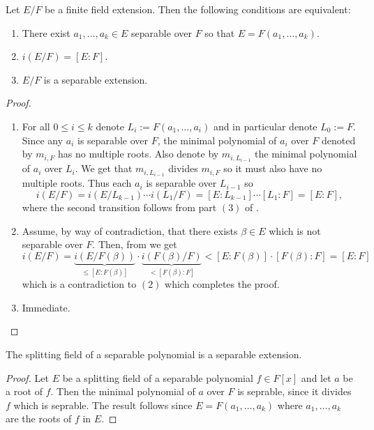 \documentclass[11pt,a4paper]{article}
\begin{document}
\begin{proposition}
  \label{prop:i}
  Let $E/F$ be a finite field extension.
  Then the following conditions are equivalent:
  \begin{enumerate}
  \item[(1)] There exist $a_1,\dots,a_k \in E$ separable over $F$
    so that $E = F(a_1,\dots,a_k)$.
  \item[(2)] $i(E/F) = [E : F]$.
  \item[(3)] $E/F$ is a separable extension.
  \end{enumerate}
\end{proposition}
\begin{proof} \phantom{}
 \begin{enumerate}
  \item[$(1 \to 2)$] For all $0 \le i \le k$ denote
    $L_i := F(a_1,\dots,a_i)$ and in particular denote $L_0 := F$.
    Since any $a_i$ is separable over $F$, the minimal polynomial 
    of $a_i$ over $F$ denoted by $m_{i,F}$ has no multiple roots.
    Also denote by $m_{i,L_{i-1}}$ the minimal polynomial of $a_i$
    over $L_i$.
    We get that $m_{i,L_{i-1}}$ divides $m_{i,F}$ so it must also have
    no multiple roots.
    Thus each $a_i$ is separable over $L_{i-1}$ so
    \[
      i(E/F) =
      i(E/{L_{k-1}}) \cdots i(L_1/F) =
      [E : L_{k-1}] \cdots [L_1 : F] = [E : F],
    \]
    where the second transition follows from part $(3)$ of .
  \item[$(2 \to 3)$] Assume, by way of contradiction,
    that there exists $\beta \in E$ which is not separable over $F$.
    Then, from  we get
    \[
      i(E/F) =
      \underbrace{i(E / F(\beta))}_{\le [E : F(\beta)]} \cdot
      \underbrace{i(F(\beta) / F)}_{< [F(\beta) : F]} <
      [E : F(\beta)] \cdot [F(\beta) : F] = [E:F]
    \]
    which is a contradiction to $(2)$ which completes the proof.
  \item[$(3 \to 1)$] Immediate.
  \end{enumerate}
\end{proof}

\begin{corollary}
  The splitting field of a separable polynomial is a separable extension.
\end{corollary}
\begin{proof}
  Let $E$ be a splitting field of a separable polynomial $f \in F[x]$
  and let $a$ be a root of $f$.
  Then the minimal polynomial of $a$ over $F$ is seprable,
  since it divides $f$ which is seprable.
  The result follows since $E = F(a_1,\dots,a_k)$
  where $a_1,\dots,a_k$ are the roots of $f$ in $E$.
\end{proof}
\end{document}
